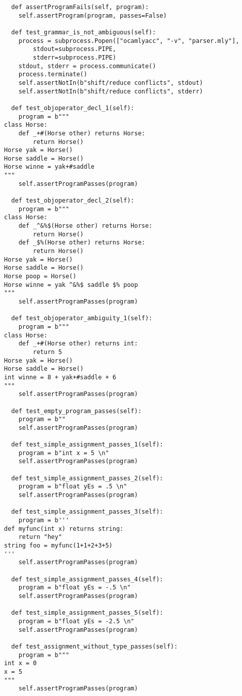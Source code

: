 \documentclass{article}
\begin{document}
\begin{verbatim}
  def assertProgramFails(self, program):
    self.assertProgram(program, passes=False)

  def test_grammar_is_not_ambiguous(self):
    process = subprocess.Popen(["ocamlyacc", "-v", "parser.mly"],
        stdout=subprocess.PIPE,
        stderr=subprocess.PIPE)
    stdout, stderr = process.communicate()
    process.terminate()
    self.assertNotIn(b"shift/reduce conflicts", stdout)
    self.assertNotIn(b"shift/reduce conflicts", stderr)

  def test_objoperator_decl_1(self):
    program = b"""
class Horse:
	def _+#(Horse other) returns Horse:
		return Horse()
Horse yak = Horse()
Horse saddle = Horse()
Horse winne = yak+#saddle
"""
    self.assertProgramPasses(program)

  def test_objoperator_decl_2(self):
    program = b"""
class Horse:
	def _^&%$(Horse other) returns Horse:
		return Horse()
	def _$%(Horse other) returns Horse:
		return Horse()
Horse yak = Horse()
Horse saddle = Horse()
Horse poop = Horse()
Horse winne = yak ^&%$ saddle $% poop
"""
    self.assertProgramPasses(program)

  def test_objoperator_ambiguity_1(self):
    program = b"""
class Horse:
	def _+#(Horse other) returns int:
		return 5
Horse yak = Horse()
Horse saddle = Horse()
int winne = 8 + yak+#saddle + 6
"""
    self.assertProgramPasses(program)

  def test_empty_program_passes(self):
    program = b""
    self.assertProgramPasses(program)

  def test_simple_assignment_passes_1(self):
    program = b"int x = 5 \n"
    self.assertProgramPasses(program)

  def test_simple_assignment_passes_2(self):
    program = b"float yEs = .5 \n"
    self.assertProgramPasses(program)

  def test_simple_assignment_passes_3(self):
    program = b'''
def myfunc(int x) returns string:
	return "hey"
string foo = myfunc(1+1+2+3+5)
'''
    self.assertProgramPasses(program)

  def test_simple_assignment_passes_4(self):
    program = b"float yEs = -.5 \n"
    self.assertProgramPasses(program)

  def test_simple_assignment_passes_5(self):
    program = b"float yEs = -2.5 \n"
    self.assertProgramPasses(program)

  def test_assignment_without_type_passes(self):
    program = b"""
int x = 0
x = 5
"""
    self.assertProgramPasses(program)


\end{verbatim}
\end{document}
